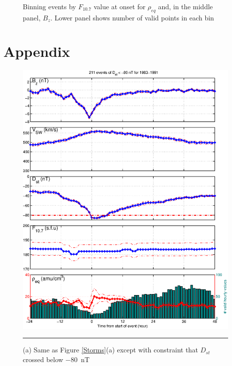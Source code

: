 \documentclass[10pt,twocolumn]{article}
\begin{document}
\begin{figure}[tp!]
\caption{Binning events by $F_{10.7}$ value at onset for $\rho_{eq}$ and, in the middle panel, $B_z$. Lower panel shows number of valid points in each bin}
\label{f107bin}
\end{figure}

\clearpage

\section{Appendix}
\hfill

\begin{figure}[htp!]
\centering
\includegraphics[scale=0.40]{paperfigures/stormavs-d80.eps}
\rule[1ex]{5cm}{1pt}
\caption{(a) Same as Figure \ref{Storms}(a) except with constraint that $D_{st}$ crossed below $-80$~nT }
\label{Dspec}
\end{figure}

\clearpage
\end{document}
